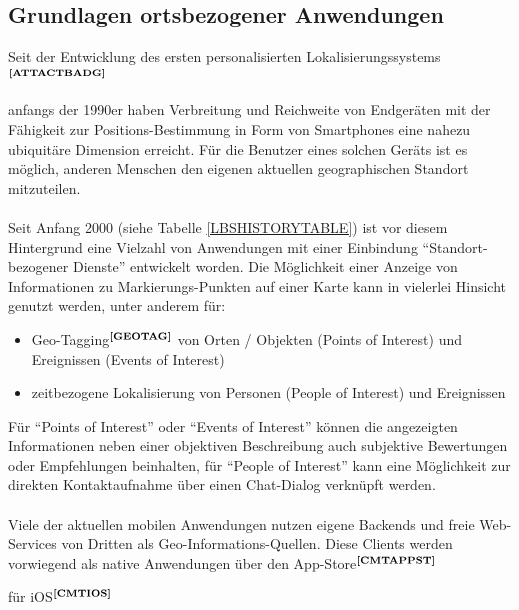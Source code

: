 \subsection{Grundlagen ortsbezogener Anwendungen}\label{3_GRUNDL}
Seit der Entwicklung des ersten personalisierten Lokalisierungssystems$^{\textbf{\ref{ATTACTBADG}}}$%
\addtocounter{footnote}{1}%
anfangs der 1990er haben Verbreitung und Reichweite von Endgeräten mit der Fähigkeit zur Positions-Bestimmung in Form von Smartphones eine nahezu ubiquitäre Dimension erreicht. Für die Benutzer eines solchen Geräts ist es möglich, anderen Menschen den eigenen aktuellen geographischen Standort mitzuteilen. \\ \\
Seit Anfang 2000 (siehe Tabelle \ref{LBSHISTORYTABLE}) ist vor diesem Hintergrund eine Vielzahl von Anwendungen mit einer Einbindung "`Standort-bezogener Dienste"' entwickelt worden. Die Möglichkeit einer Anzeige von Informationen zu Markierungs-Punkten auf einer Karte kann in vielerlei Hinsicht genutzt werden, unter anderem für:
\begin{itemize}
  \item Geo-Tagging$^{\textbf{\ref{GEOTAG}}}$ von Orten / Objekten (Points of Interest) und Ereignissen (Events of Interest)
  \item zeitbezogene Lokalisierung von Personen (People of Interest) und Ereignissen
\end{itemize}
Für "`Points of Interest"' oder "`Events of Interest"' können die angezeigten Informationen neben einer objektiven Beschreibung auch subjektive Bewertungen oder Empfehlungen beinhalten, für "`People of Interest"' kann eine Möglichkeit zur direkten Kontaktaufnahme über einen Chat-Dialog verknüpft werden.\\ \\
Viele der aktuellen mobilen Anwendungen nutzen eigene Backends und freie Web-Services von Dritten als Geo-Informations-Quellen. Diese Clients werden vorwiegend als native Anwendungen über den App-Store$^{\textbf{\ref{CMTAPPST}}}$%
\addtocounter{footnote}{1}%
 für iOS$^{\textbf{\ref{CMTIOS}}}$%

